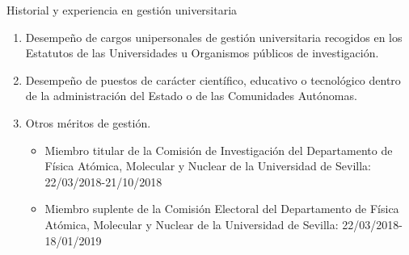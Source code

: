 \documentclass{resume2} %
\begin{document}
\begin{rSection}{Historial y experiencia en gesti\'on universitaria}

\begin{enumerate}[label=\alph*.]
\item Desempeño de cargos unipersonales de gestión universitaria recogidos en los Estatutos de las Universidades u Organismos públicos de investigación.
\item Desempeño de puestos de carácter científico, educativo o tecnológico dentro de la administración del Estado o de las Comunidades Autónomas.
\item Otros méritos de gestión.

\begin{itemize}
\item Miembro titular de la Comisi\'on de Investigaci\'on del Departamento de F\'isica At\'omica, Molecular y Nuclear de la Universidad de Sevilla: 22/03/2018-21/10/2018
\item Miembro suplente de la Comisi\'on Electoral del Departamento de F\'isica At\'omica, Molecular y Nuclear de la Universidad de Sevilla: 22/03/2018-18/01/2019
\end{itemize}

\end{enumerate}

\end{rSection}
\end{document}
